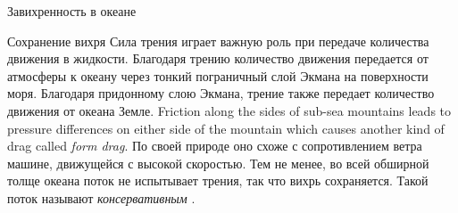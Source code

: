 \begin{chapter}{Завихренность в океане}
\begin{section}{Сохранение вихря}
Сила трения играет важную роль при передаче количества движения в
жидкости. Благодаря трению количество движения передается от атмосферы 
к океану через тонкий пограничный слой Экмана
на поверхности моря. Благодаря придонному слою Экмана, трение также
передает количество движения от океана Земле.
Friction along the sides of sub-sea mountains leads to pressure differences on
either side of the mountain which causes another kind of drag called
\emph{form drag}.
По своей природе оно схоже с сопротивлением ветра машине, движущейся с высокой 
скоростью. Тем не менее, во всей обширной толще океана
поток не испытывает трения, так что вихрь сохраняется. 
Такой поток называют \emph{консервативным}%
%
.
%


\end{section}
\end{chapter}
